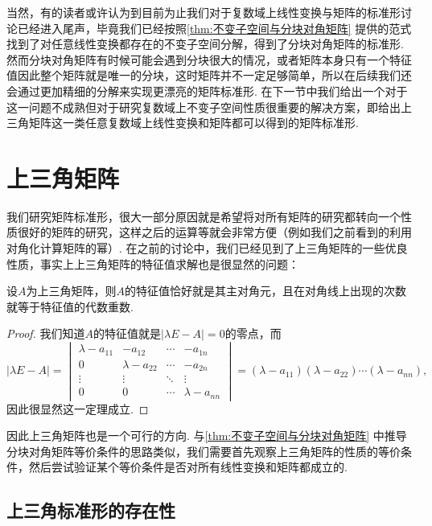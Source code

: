 当然，有的读者或许认为到目前为止我们对于复数域上线性变换与矩阵的标准形讨论已经进入尾声，毕竟我们已经按照\autoref{thm:不变子空间与分块对角矩阵} 提供的范式找到了对任意线性变换都存在的不变子空间分解，得到了分块对角矩阵的标准形. 然而分块对角矩阵有时候可能会遇到分块很大的情况，或者矩阵本身只有一个特征值因此整个矩阵就是唯一的分块，这时矩阵并不一定足够简单，所以在后续我们还会通过更加精细的分解来实现更漂亮的矩阵标准形. 在下一节中我们给出一个对于这一问题不成熟但对于研究复数域上不变子空间性质很重要的解决方案，即给出上三角矩阵这一类任意复数域上线性变换和矩阵都可以得到的矩阵标准形.

\section{上三角矩阵}

我们研究矩阵标准形，很大一部分原因就是希望将对所有矩阵的研究都转向一个性质很好的矩阵的研究，这样之后的运算等就会非常方便（例如我们之前看到的利用对角化计算矩阵的幂）. 在之前的讨论中，我们已经见到了上三角矩阵的一些优良性质，事实上上三角矩阵的特征值求解也是很显然的问题：
\begin{theorem}{}{}
    设$A$为上三角矩阵，则$A$的特征值恰好就是其主对角元，且在对角线上出现的次数就等于特征值的代数重数.
\end{theorem}
\begin{proof}
    我们知道$A$的特征值就是$|\lambda E-A|=0$的零点，而
    \[|\lambda E-A|=\begin{vmatrix}
            \lambda-a_{11} & -a_{12}        & \cdots & -a_{1n}        \\
            0              & \lambda-a_{22} & \cdots & -a_{2n}        \\
            \vdots         & \vdots         & \ddots & \vdots         \\
            0              & 0              & \cdots & \lambda-a_{nn}
        \end{vmatrix}=(\lambda-a_{11})(\lambda-a_{22})\cdots(\lambda-a_{nn}),\]
    因此很显然这一定理成立.
\end{proof}

因此上三角矩阵也是一个可行的方向. 与\autoref{thm:不变子空间与分块对角矩阵} 中推导分块对角矩阵等价条件的思路类似，我们需要首先观察上三角矩阵的性质的等价条件，然后尝试验证某个等价条件是否对所有线性变换和矩阵都成立的.

\subsection{上三角标准形的存在性}

